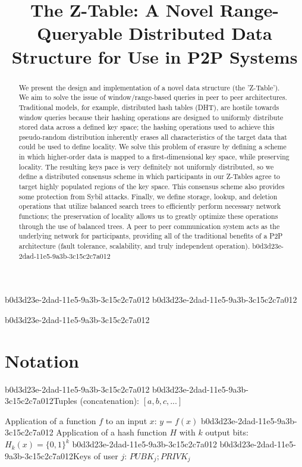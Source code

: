 \documentclass[12pt]{article}
\title{The Z-Table: A Novel Range-Queryable Distributed Data Structure for Use in P2P Systems}
\begin{document}
b0d3d23e-2dad-11e5-9a3b-3c15c2c7a012
b0d3d23e-2dad-11e5-9a3b-3c15c2c7a012\maketitle

b0d3d23e-2dad-11e5-9a3b-3c15c2c7a012\begin{abstract}
We present the design and implementation of a novel data structure (the 'Z-Table'). We aim to solve the issue of window/range-based queries in peer to peer architectures. Traditional models, for example,  distributed hash tables (DHT), are hostile towards window queries because their hashing operations are designed to uniformly distribute stored data across a defined key space; the hashing operations used to achieve this pseudo-random distribution inherently erases all characteristics of the target data that could be used to define locality. We solve this problem of erasure by defining a scheme in which higher-order data is mapped to a first-dimensional key space, while preserving locality. The resulting keys pace is very definitely not uniformly distributed, so we define a distributed consensus scheme in which participants in our Z-Tables agree to target highly populated regions of the key space. This consensus scheme also provides some protection from Sybil attacks. Finally, we define storage, lookup, and deletion operations that utilize balanced search trees to efficiently perform necessary network functions; the preservation of locality allows us to greatly optimize these operations through the use of balanced trees. A peer to peer communication system acts as the underlying network for participants, providing all of the traditional benefits of a P2P architecture (fault tolerance, scalability, and truly independent operation).
b0d3d23e-2dad-11e5-9a3b-3c15c2c7a012\end{abstract}

\section{Notation}
b0d3d23e-2dad-11e5-9a3b-3c15c2c7a012
b0d3d23e-2dad-11e5-9a3b-3c15c2c7a012Tuples (concatenation): $[a,b,c,...]$

Application of a function $f$ to an input $x$: $y=f(x)$
b0d3d23e-2dad-11e5-9a3b-3c15c2c7a012
Application of a hash function $H$ with $k$ output bits: $H_{k}(x) = \{0,1\}^k$
b0d3d23e-2dad-11e5-9a3b-3c15c2c7a012
b0d3d23e-2dad-11e5-9a3b-3c15c2c7a012Keys of user $j$: $ PUBK_j; PRIVK_j $
\end{document}
